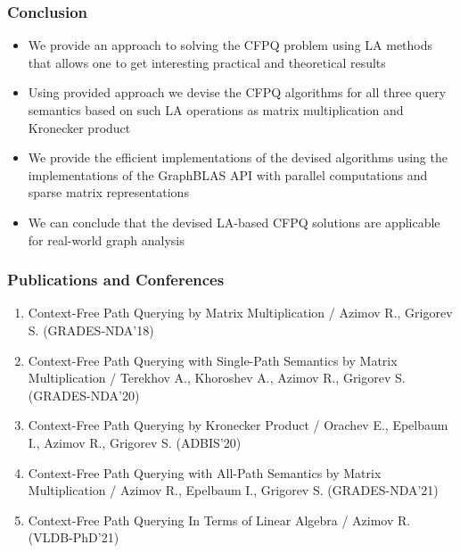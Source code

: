 \documentclass[xcolor=table,aspectratio=169]{beamer}
\begin{document}
\begin{frame}[fragile] \frametitle{Conclusion}
  \begin{itemize}
    \item We provide an approach to solving the CFPQ
    problem using LA methods that allows one to get interesting practical and theoretical results
    \pause
    \item Using provided approach we devise the CFPQ algorithms for all three query semantics based on such LA operations as matrix multiplication and Kronecker product
    \pause
    \item We provide the efficient implementations of the devised algorithms using the implementations of the GraphBLAS API with parallel computations and sparse matrix representations
    \pause
    \item We can conclude that the devised LA-based CFPQ solutions are applicable for real-world graph analysis
  \end{itemize}
    
    
\end{frame}

\begin{frame}[fragile] \frametitle{Publications and Conferences}
	\begin{enumerate}
		\item Context-Free Path Querying by
		Matrix Multiplication / Azimov R., Grigorev S. (GRADES-NDA’18)
		\item Context-Free Path Querying with Single-Path Semantics by
		Matrix Multiplication / Terekhov A., Khoroshev A., Azimov R., Grigorev S. (GRADES-NDA’20)
		\item Context-Free Path Querying by Kronecker
		Product / Orachev E., Epelbaum I., Azimov R., Grigorev S. (ADBIS’20)
		\item Context-Free Path Querying with All-Path Semantics by
		Matrix Multiplication / Azimov R., Epelbaum I., Grigorev S. (GRADES-NDA’21)
		
		\item Context-Free Path Querying In Terms of Linear Algebra / Azimov R. (VLDB-PhD'21)
	\end{enumerate}
\end{frame}
\end{document}
